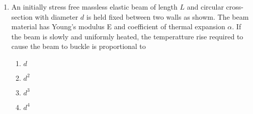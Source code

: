 \documentclass[journal,12pt,onecolumn]{IEEEtran}
\theoremstyle{remark}
\begin{document}
\begin{enumerate}
    \item An initially stress free massless elastic beam of length $L$ and circular cross-section
        with diameter $d$  is held fixed between two walls as showm. The beam material
        has Young's modulus E and coefficient of thermal expansion $\alpha$. If the beam is slowly and
        uniformly heated, the temperatture rise required to cause the beam to buckle is proportional to
        \begin{center}
            \resizebox{0.5\textwidth}{!}{
                
            } 
        \end{center}
        \hfill{}
        \begin{multicols}{4}
            \begin{enumerate}
                \item $d$
                    \columnbreak
                \item $d^2$
                    \columnbreak
                \item $d^3$
                    \columnbreak
                \item $d^4$
            \end{enumerate}
        \end{multicols}
\end{enumerate}
\end{document}
